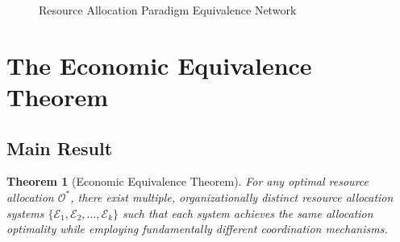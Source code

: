 \documentclass[12pt,a4paper]{article}
\newtheorem{theorem}{Theorem}
\begin{document}
\begin{figure}[H]
\caption{Resource Allocation Paradigm Equivalence Network}
\label{fig:paradigm_equivalence}
\end{figure}

\section{The Economic Equivalence Theorem}

\subsection{Main Result}

\begin{theorem}[Economic Equivalence Theorem]
For any optimal resource allocation $\mathcal{O}^*$, there exist multiple, organizationally distinct resource allocation systems $\{\mathcal{E}_1, \mathcal{E}_2, \ldots, \mathcal{E}_k\}$ such that each system achieves the same allocation optimality while employing fundamentally different coordination mechanisms.
\end{theorem}
\end{document}
